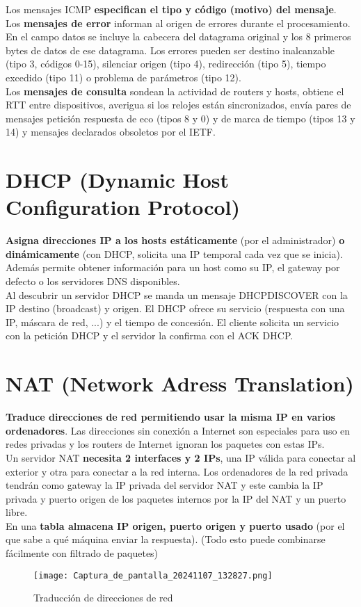 \documentclass{article}
\begin{document}
Los mensajes ICMP \textbf{especifican el tipo y código (motivo) del mensaje}. \\

Los \textbf{mensajes de error} informan al origen de errores durante el procesamiento. En el campo datos se incluye la cabecera del datagrama original y los 8 primeros bytes de datos de ese datagrama. Los errores pueden ser destino inalcanzable (tipo 3, códigos 0-15), silenciar origen (tipo 4), redirección (tipo 5), tiempo excedido (tipo 11) o problema de parámetros (tipo 12). \\

Los \textbf{mensajes de consulta} sondean la actividad de routers y hosts, obtiene el RTT entre dispositivos, averigua si los relojes están sincronizados, envía pares de mensajes petición respuesta de eco (tipos 8 y 0) y de marca de tiempo (tipos 13 y 14) y mensajes declarados obsoletos por el IETF. \\

\section{DHCP (Dynamic Host Configuration Protocol)}
\textbf{Asigna direcciones IP a los hosts estáticamente} (por el administrador) \textbf{o dinámicamente} (con DHCP, solicita una IP temporal cada vez que se inicia). Además permite obtener información para un host como su IP, el gateway por defecto o los servidores DNS disponibles. \\
Al descubrir un servidor DHCP se manda un mensaje DHCPDISCOVER con la IP destino (broadcast) y origen. El DHCP ofrece su servicio (respuesta con una IP, máscara de red, ...) y el tiempo de concesión. El cliente solicita un servicio con la petición DHCP y el servidor la confirma
con el ACK DHCP. 

\section{NAT (Network Adress Translation)}
\textbf{Traduce direcciones de red permitiendo usar la misma IP en varios ordenadores}. Las direcciones sin conexión a Internet son especiales para uso en redes privadas y los routers de Internet ignoran los paquetes con estas IPs. \\
Un servidor NAT \textbf{necesita 2 interfaces y 2 IPs}, una IP válida para conectar al exterior y otra para conectar a la red interna. Los ordenadores de la red privada tendrán como gateway la IP privada del servidor NAT y este cambia la IP privada y puerto origen de los paquetes internos por la IP del NAT y un puerto libre. \\
En una \textbf{tabla almacena IP origen, puerto origen y puerto usado} (por el que sabe a qué máquina
enviar la respuesta). (Todo esto puede combinarse fácilmente con filtrado de paquetes)

\begin{figure}[h]
    \centering
    \texttt{[image: Captura\_de\_pantalla\_20241107\_132827.png]}
    \caption{Traducción de direcciones de red}
    \label{fig:etiqueta}
\end{figure}
\end{document}
